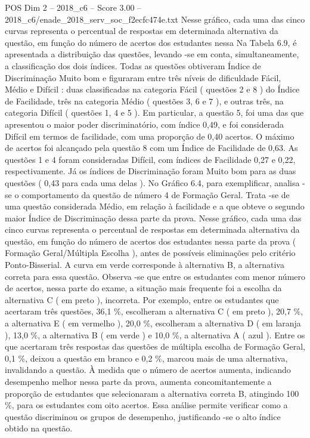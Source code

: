 \begin{textsample}{POS Dim 2 – 2018\_c6 – Score 3.00 – 2018\_c6/enade\_2018\_serv\_soc\_f2ecfc474e.txt}
Nesse gráfico, cada uma das cinco curvas representa o percentual de respostas em determinada alternativa da questão, em função do número de acertos dos estudantes nessa Na Tabela 6.9, é apresentada a distribuição das questões, levando -se em conta, simultaneamente, a classificação dos dois índices.
Todas as questões obtiveram Índice de Discriminação Muito bom e figuraram entre três níveis de dificuldade Fácil, Médio e Difícil : duas classificadas na categoria Fácil ( questões 2 e 8 ) do Índice de Facilidade, três na categoria Médio ( questões 3, 6 e 7 ), e outras três, na categoria Difícil ( questões 1, 4 e 5 ).
Em particular, a questão 5, foi uma das que apresentou o maior poder discriminatório, com índice 0,49, e foi considerada Difícil em termos de facilidade, com uma proporção de 0,40 acertos.
O máximo de acertos foi alcançado pela questão 8 com um Índice de Facilidade de 0,63.
As questões 1 e 4 foram consideradas Difícil, com índices de Facilidade 0,27 e 0,22, respectivamente.
Já os índices de Discriminação foram Muito bom para as duas questões ( 0,43 para cada uma delas ).
No Gráfico 6.4, para exemplificar, analisa -se o comportamento da questão de número 4 de Formação Geral.
Trata -se de uma questão considerada Médio, em relação à facilidade e a que obteve o segundo maior Índice de Discriminação dessa parte da prova.
Nesse gráfico, cada uma das cinco curvas representa o percentual de respostas em determinada alternativa da questão, em função do número de acertos dos estudantes nessa parte da prova ( Formação Geral/Múltipla Escolha ), antes de possíveis eliminações pelo critério Ponto-Bisserial.
A curva em verde corresponde à alternativa B, a alternativa correta para essa questão.
Observa -se que entre os estudantes com menor número de acertos, nessa parte do exame, a situação mais frequente foi a escolha da alternativa C ( em preto ), incorreta.
Por exemplo, entre os estudantes que acertaram três questões, 36,1 \%, escolheram a alternativa C ( em preto ), 20,7 \%, a alternativa E ( em vermelho ), 20,0 \%, escolheram a alternativa D ( em laranja ), 13,0 \%, a alternativa B ( em verde ) e 10,0 \%, a alternativa A ( azul ).
Entre os que acertaram três respostas das questões de múltipla escolha de Formação Geral, 0,1 \%, deixou a questão em branco e 0,2 \%, marcou mais de uma alternativa, invalidando a questão.
À medida que o número de acertos aumenta, indicando desempenho melhor nessa parte da prova, aumenta concomitantemente a proporção de estudantes que selecionaram a alternativa correta B, atingindo 100 \%, para os estudantes com oito acertos.
Essa análise permite verificar como a questão discriminou os grupos de desempenho, justificando -se o alto índice obtido na questão.

\end{textsample}
